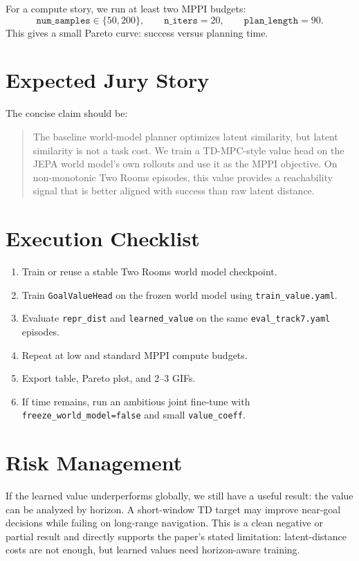 \documentclass[11pt]{article}
\newcommand{\code}[1]{\texttt{#1}}
\begin{document}
For a compute story, we run at least two MPPI budgets:
\[
  \code{num\_samples} \in \{50, 200\}, \qquad
  \code{n\_iters}=20, \qquad
  \code{plan\_length}=90.
\]
This gives a small Pareto curve: success versus planning time.

\section{Expected Jury Story}

The concise claim should be:

\begin{quote}
The baseline world-model planner optimizes latent similarity, but latent
similarity is not a task cost. We train a TD-MPC-style value head on the JEPA
world model's own rollouts and use it as the MPPI objective. On non-monotonic
Two Rooms episodes, this value provides a reachability signal that is better
aligned with success than raw latent distance.
\end{quote}

\section{Execution Checklist}

\begin{enumerate}
  \item Train or reuse a stable Two Rooms world model checkpoint.
  \item Train \code{GoalValueHead} on the frozen world model using
  \code{train\_value.yaml}.
  \item Evaluate \code{repr\_dist} and \code{learned\_value} on the same
  \code{eval\_track7.yaml} episodes.
  \item Repeat at low and standard MPPI compute budgets.
  \item Export table, Pareto plot, and 2--3 GIFs.
  \item If time remains, run an ambitious joint fine-tune with
  \code{freeze\_world\_model=false} and small \code{value\_coeff}.
\end{enumerate}

\section{Risk Management}

If the learned value underperforms globally, we still have a useful result:
the value can be analyzed by horizon. A short-window TD target may improve
near-goal decisions while failing on long-range navigation. This is a clean
negative or partial result and directly supports the paper's stated limitation:
latent-distance costs are not enough, but learned values need horizon-aware
training.
\end{document}
